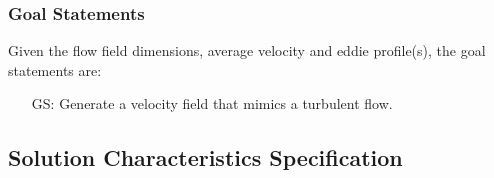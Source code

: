 \documentclass[12pt]{article}
\newcounter{goalnum} %
\begin{document}


\subsubsection{Goal Statements}


\noindent Given the flow field dimensions, average velocity and eddie profile(s), the goal statements are:

\begin{itemize}

\item[GS\refstepcounter{goalnum}\thegoalnum \label{G_anyFlowField}:] Generate a velocity field that mimics a turbulent flow.


\end{itemize}

\subsection{Solution Characteristics Specification}
\end{document}
